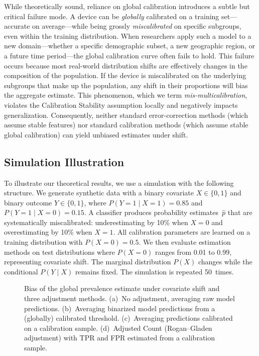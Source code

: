 \documentclass[12pt]{article}
\begin{document}

While theoretically sound, reliance on global calibration introduces a
subtle but critical failure mode. A device can be \emph{globally}
calibrated on a training set---accurate on average---while being grossly
\emph{miscalibrated} on specific subgroups, even within the training
distribution. When researchers apply such a model to a new domain---whether
a specific demographic subset, a new geographic region, or a future time
period---the global calibration curve often fails to hold. This failure
occurs because most real-world distribution shifts are effectively changes
in the composition of the population. If the device is miscalibrated on the
underlying subgroups that make up the population, any shift in their
proportions will bias the aggregate estimate. This phenomenon, which we
term \emph{mis-multicalibration}, violates the Calibration Stability
assumption locally and negatively impacts generalization. Consequently,
neither standard error-correction methods (which assume stable features)
nor standard calibration methods (which assume stable global calibration)
can yield unbiased estimates under shift.

\subsection{Simulation Illustration}

To illustrate our theoretical results, we use a simulation with the
following structure. We generate synthetic data with a binary covariate
$X \in \{0, 1\}$ and binary outcome $Y \in \{0, 1\}$, where
$P(Y=1 \mid X=1) = 0.85$ and $P(Y=1 \mid X=0) = 0.15$. A classifier
produces probability estimates~$\hat{p}$ that are systematically
miscalibrated: underestimating by 10\% when $X=0$ and overestimating by
10\% when $X=1$. All calibration parameters are learned on a training
distribution with $P(X=0) = 0.5$. We then evaluate estimation methods on
test distributions where $P(X=0)$ ranges from 0.01 to 0.99, representing
covariate shift. The marginal distribution $P(X)$ changes while the
conditional $P(Y \mid X)$ remains fixed. The simulation is repeated
50~times.

\begin{figure}[htbp]
  \centering
  \caption{Bias of the global prevalence estimate under covariate shift and
    three adjustment methods. (a)~No adjustment, averaging raw model
    predictions. (b)~Averaging binarized model predictions from a
    (globally) calibrated threshold. (c)~Averaging predictions calibrated
    on a calibration sample. (d)~Adjusted Count (Rogan--Gladen adjustment)
    with TPR and FPR estimated from a calibration sample.}
  \label{fig:simulation-bias}
\end{figure}
\end{document}
